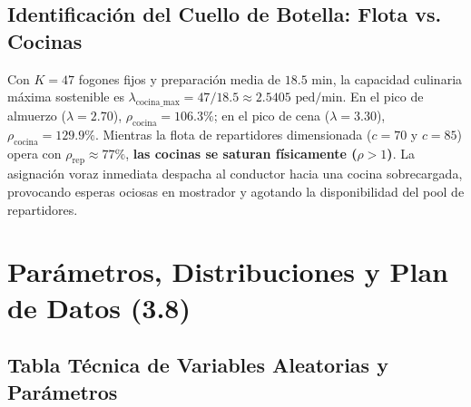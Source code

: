 \documentclass[11pt,letterpaper]{article}
\begin{document}
\subsection{Identificación del Cuello de Botella: Flota vs. Cocinas}
Con $K = 47$ fogones fijos y preparación media de $18.5\text{ min}$, la capacidad culinaria máxima sostenible es $\lambda_{\text{cocina\_max}} = 47 / 18.5 \approx 2.5405\text{ ped/min}$. En el pico de almuerzo ($\lambda = 2.70$), $\rho_{\text{cocina}} = 106.3\%$; en el pico de cena ($\lambda = 3.30$), $\rho_{\text{cocina}} = 129.9\%$. Mientras la flota de repartidores dimensionada ($c=70$ y $c=85$) opera con $\rho_{\text{rep}} \approx 77\%$, \textbf{las cocinas se saturan físicamente ($\rho > 1$)}. La asignación voraz inmediata despacha al conductor hacia una cocina sobrecargada, provocando esperas ociosas en mostrador y agotando la disponibilidad del pool de repartidores.

\section{Parámetros, Distribuciones y Plan de Datos (3.8)}

\subsection{Tabla Técnica de Variables Aleatorias y Parámetros}
\end{document}

